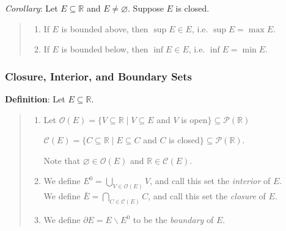 \documentclass[11pt]{article}
\begin{document}
\emph{Corollary}: Let $E \subseteq \mathbb{R}$ and $E \neq \varnothing$. Suppose $E$ is closed.
\begin{quote}\vspace{-0.3cm}
	\begin{enumerate}
	\item If $E$ is bounded above, then $\sup E \in E$, i.e. $\sup E = \max E$.
	\item If $E$ is bounded below, then $\inf E \in E$, i.e. $\inf E = \min E$.
	\end{enumerate}
\end{quote}

\subsubsection{Closure, Interior, and Boundary Sets}

\textbf{Definition}: Let $E \subseteq \mathbb{R}$.
\begin{quote}\vspace{-0.3cm}
	\begin{enumerate}
	\item Let $\mathcal{O}(E) = \{V \subseteq \mathbb{R} \mid V \subseteq E$ and $V$ is open$\} \subseteq \mathcal{P}(\mathbb{R})$

	\hspace{0.75cm}$\mathcal{C}(E) = \{C \subseteq \mathbb{R} \mid E \subseteq C$ and $C$ is closed$\} \subseteq \mathcal{P}(\mathbb{R})$.

	Note that $\varnothing \in \mathcal{O}(E)$ and $\mathbb{R} \in \mathcal{C}(E)$.

	\item We define $E^0 = \bigcup_{V \in \mathcal{O}(E)} V$, and call this set the \emph{interior} of $E$.\\
	We define $\bar{E} = \bigcap_{C \in \mathcal{C}(E)} C$, and call this set the \emph{closure} of $E$.

	\item We define $\partial E = E \backslash E^0$ to be the \emph{boundary} of $E$.
	\end{enumerate}
\end{quote}
\end{document}
